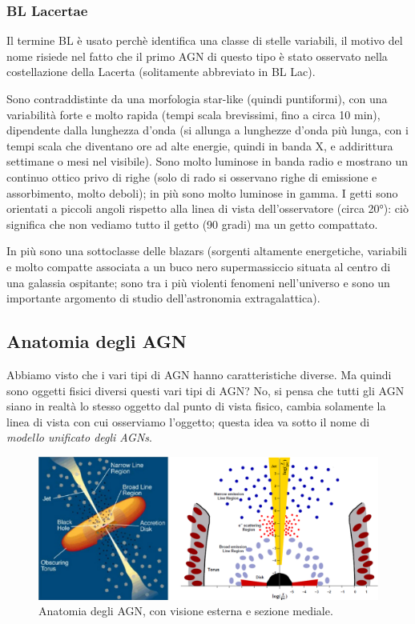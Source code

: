 \subsubsection{BL Lacertae} 
Il termine BL è usato perchè identifica una classe di stelle variabili, il motivo del nome risiede nel fatto che il primo AGN di questo tipo è stato osservato nella costellazione della Lacerta (solitamente abbreviato in BL Lac). 

Sono contraddistinte da una morfologia star-like (quindi puntiformi), con una variabilità forte e molto rapida (tempi scala brevissimi, fino a circa 10 min), dipendente dalla lunghezza d’onda (si allunga a lunghezze d’onda più lunga, con i tempi scala che diventano ore ad alte energie, quindi in banda X, e addirittura settimane o mesi nel visibile). Sono molto luminose in banda radio e mostrano un continuo ottico privo di righe (solo di rado si osservano righe di emissione e assorbimento, molto deboli); in più sono molto luminose in gamma. I getti sono orientati a piccoli angoli rispetto alla linea di vista dell’osservatore (circa 20°): ciò significa che non vediamo tutto il getto (90 gradi) ma un getto compattato.

In più sono una sottoclasse delle blazars (sorgenti altamente energetiche, variabili e molto compatte associata a un buco nero supermassiccio situata al centro di una galassia ospitante; sono tra i più violenti fenomeni nell'universo e sono un importante argomento di studio dell'astronomia extragalattica).

\subsection{Anatomia degli AGN}
Abbiamo visto che i vari tipi di AGN hanno caratteristiche diverse. Ma quindi sono oggetti fisici diversi questi vari tipi di AGN? No, si pensa che tutti gli AGN siano in realtà lo stesso oggetto dal punto di vista fisico, cambia solamente la linea di vista con cui osserviamo l’oggetto; questa idea va sotto il nome di \emph{modello unificato degli AGNs}.

\begin{figure}
    \centering
    \includegraphics[width = \textwidth]{immagini/sezione-e-anatomia-agn.png}
    \caption{Anatomia degli AGN, con visione esterna e sezione mediale.}
    \label{fig:sezione-e-anatomia-agn}
\end{figure}

